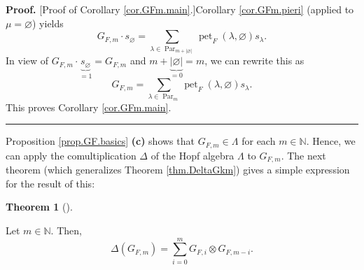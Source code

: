 \documentclass[numbers=enddot,12pt,final,onecolumn,notitlepage]{scrartcl}%
\theoremstyle{definition}
\newtheorem{theo}{Theorem}[section]
\newenvironment{theorem}[1][]
{\begin{theo}[#1]\begin{leftbar}}
{\end{leftbar}\end{theo}}
\newenvironment{proof}[1][Proof]{\noindent\textbf{#1.} }{\ \rule{0.5em}{0.5em}}
\let\sumnonlimits\sum
\renewcommand{\sum}{\sumnonlimits\limits}
\newenvironment{verlong}{}{}
\begin{document}
\begin{verlong}
\begin{proof}
[Proof of Corollary \ref{cor.GFm.main}.]Corollary \ref{cor.GFm.pieri} (applied
to $\mu=\varnothing$) yields%
\[
G_{F,m}\cdot s_{\varnothing}=\sum_{\lambda\in\operatorname*{Par}%
\nolimits_{m+\left\vert \varnothing\right\vert }}\operatorname*{pet}%
\nolimits_{F}\left(  \lambda,\varnothing\right)  s_{\lambda}.
\]
In view of $G_{F,m}\cdot\underbrace{s_{\varnothing}}_{=1}=G_{F,m}$ and
$m+\underbrace{\left\vert \varnothing\right\vert }_{=0}=m$, we can rewrite
this as
\[
G_{F,m}=\sum_{\lambda\in\operatorname*{Par}\nolimits_{m}}\operatorname*{pet}%
\nolimits_{F}\left(  \lambda,\varnothing\right)  s_{\lambda}.
\]
This proves Corollary \ref{cor.GFm.main}.
\end{proof}
\end{verlong}

Proposition \ref{prop.GF.basics} \textbf{(c)} shows that $G_{F,m}\in\Lambda$
for each $m\in\mathbb{N}$. Hence, we can apply the comultiplication $\Delta$
of the Hopf algebra $\Lambda$ to $G_{F,m}$. The next theorem (which
generalizes Theorem \ref{thm.DeltaGkm}) gives a simple expression for the
result of this:

\begin{theorem}
\label{thm.DeltaGFm}Let $m\in\mathbb{N}$. Then,%
\[
\Delta\left(  G_{F,m}\right)  =\sum_{i=0}^{m}G_{F,i}\otimes G_{F,m-i}.
\]

\end{theorem}
\end{document}
